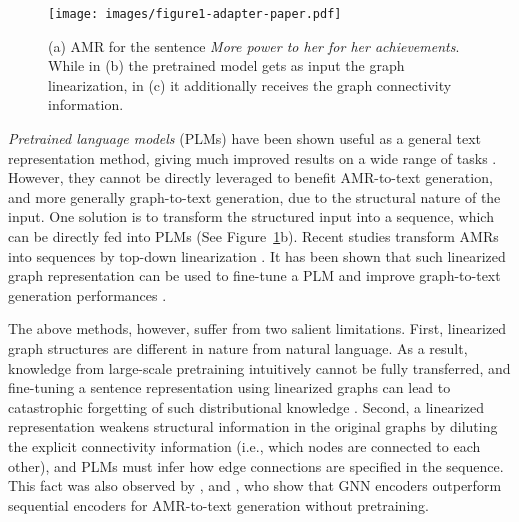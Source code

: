 \documentclass[11pt]{article}
\begin{document}
\begin{figure}[t]
    \centering
    \texttt{[image: images/figure1-adapter-paper.pdf]}
    \caption{(a) AMR for the sentence \textit{More power to her for her achievements}. While in (b) the pretrained model gets as input the graph linearization, in (c) it additionally receives the graph connectivity information.}
    \label{fig:amrexamples}
\end{figure}

\emph{Pretrained language models} (PLMs) \cite{devlin-etal-2019-bert, liu2020roberta, radford2019language, lewis2019bart} have been shown useful as a general text representation method, giving much improved results on a wide range of tasks \cite{wang-etal-2018-glue, NIPS2019_8589}. However, they cannot be directly leveraged to benefit AMR-to-text generation, and more generally graph-to-text generation, due to the structural nature of the input. One solution is to transform the structured input into a sequence, which can be directly fed into PLMs (See Figure~\ref{fig:amrexamples}b). Recent studies \cite{mager2020gpttoo, harkous2020text,ribeiro2020investigating,ribeiro2021smelting} transform AMRs into sequences by top-down linearization \cite{konstas-etal-2017-neural}. It has been shown that such linearized graph representation can be used to fine-tune a PLM and improve graph-to-text generation performances \cite{kale2020texttotext}.

The above methods, however, suffer from two salient limitations. First, linearized graph structures are different in nature from natural language. As a result, knowledge from large-scale pretraining intuitively cannot be fully transferred, and fine-tuning a sentence representation using linearized graphs can lead to catastrophic forgetting of such distributional knowledge \cite{goodfellow2013an, Kirkpatrick3521}. Second, a linearized representation weakens structural information in the original graphs by diluting the explicit connectivity information (i.e., which nodes are connected to each other), and PLMs must infer how edge connections are specified in the sequence. This fact was also observed by \citet{song-etal-2018-graph}, \citet{beck-etal-2018-graph} and \citet{ribeiro-etal-2019-enhancing}, who show that GNN encoders outperform sequential encoders for AMR-to-text generation without pretraining.
\end{document}
